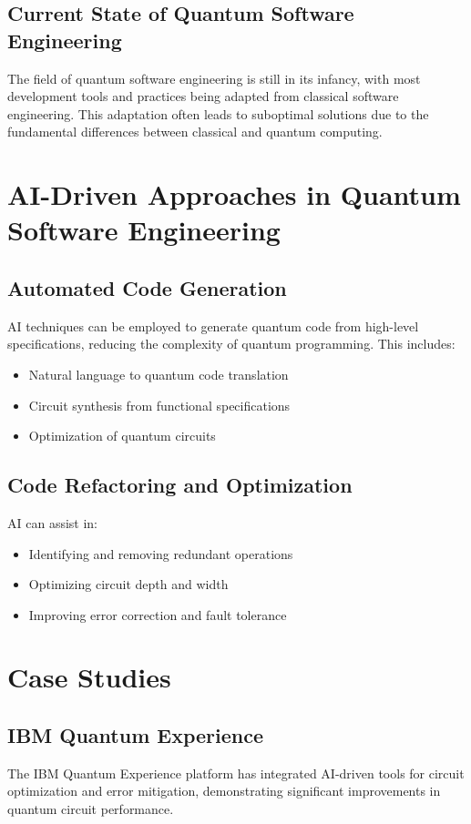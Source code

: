 \documentclass[12pt,a4paper]{article}
\begin{document}
\subsection{Current State of Quantum Software Engineering}
The field of quantum software engineering is still in its infancy, with most development tools and practices being adapted from classical software engineering. This adaptation often leads to suboptimal solutions due to the fundamental differences between classical and quantum computing.

\section{AI-Driven Approaches in Quantum Software Engineering}
\subsection{Automated Code Generation}
AI techniques can be employed to generate quantum code from high-level specifications, reducing the complexity of quantum programming. This includes:
\begin{itemize}
    \item Natural language to quantum code translation
    \item Circuit synthesis from functional specifications
    \item Optimization of quantum circuits
\end{itemize}

\subsection{Code Refactoring and Optimization}
AI can assist in:
\begin{itemize}
    \item Identifying and removing redundant operations
    \item Optimizing circuit depth and width
    \item Improving error correction and fault tolerance
\end{itemize}

\section{Case Studies}
\subsection{IBM Quantum Experience}
The IBM Quantum Experience platform has integrated AI-driven tools for circuit optimization and error mitigation, demonstrating significant improvements in quantum circuit performance.
\end{document}
